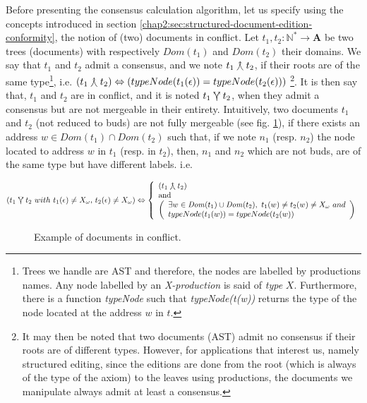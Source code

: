 \label{chap2:sec:consensus-calculation}
Before presenting the consensus calculation algorithm, let us specify using the concepts introduced in section \ref{chap2:sec:structured-document-edition-conformity}, the notion of (two) documents in conflict.
Let $t_1,t_2:\mathbb{N}^*\rightarrow \mathbf{A}$ be two trees (documents)  with respectively $\mathit{Dom}(t_1)$ and $\mathit{Dom}(t_2)$ their domains. We say that $t_1$ and $t_2$ admit a consensus, and we note $t_1\curlywedgeuparrow t_2$, if their roots are of the same type\footnote{Trees we handle are AST and therefore, the nodes are labelled by productions names. Any node labelled by an \textit{X-production} is said of \textit{type} $X$. Furthermore, there is a function \textit{typeNode} such that \textit{typeNode(t(w))} returns the type of the node located at the address $w$ in $t$.}, i.e. $\left( t_1\curlywedgeuparrow t_2 \right) \Leftrightarrow \left(typeNode(t_{1}(\epsilon)) = typeNode(t_{2}(\epsilon)) \right)$ \footnote{It may then be noted that two documents (AST) admit no consensus if their roots are of different types. However, for applications that interest us, namely structured editing, since the editions are done from the root (which is always of the type of the axiom) to the leaves using productions, the documents we manipulate always admit at least a consensus.}. It is then say that, $t_1$ and $t_2$ are in conflict, and it is noted $t_1 \curlyveeuparrow t_2$, when they admit a consensus but are not mergeable in their entirety. 
Intuitively, two documents $t_1$ and $t_2$ (not reduced to buds) are not fully mergeable (see fig. \ref{chap2:fig:tree-in-conflict}), if there exists an address $w\in \mathit{Dom}(t_1) \cap \mathit{Dom}(t_2)$ such that, if we note $n_1$ (resp. $n_2$) the node located to address $w$ in $t_1$ (resp. in $t_2$), then, $n_1$ and $n_2$ which are not buds, are of the same type but have different labels. i.e. 
\begin{center}
$
\left( t_1\curlyveeuparrow t_2 ~with~t_1(\epsilon)\neq X_\omega,\, t_2(\epsilon)\neq X_\omega\right) \Leftrightarrow \left\{\begin{array}{l}
													\left(t_1\curlywedgeuparrow t_2\right)\\
													\mbox{and}\\
													\left(\begin{array}{l}\exists w \in \mathit{Dom}(t_1)\cup \mathit{Dom}(t_2), ~t_{1}(w) \neq t_{2}(w) \neq X_\omega ~ and\\
													typeNode(t_{1}(w)) = typeNode(t_{2}(w))
													\end{array}
													\right) 
											 \end{array}
								\right.
$
\end{center}
\begin{figure}[ht!]
	\noindent
	\caption{Example of documents in conflict.}
	\label{chap2:fig:tree-in-conflict}
\end{figure}

